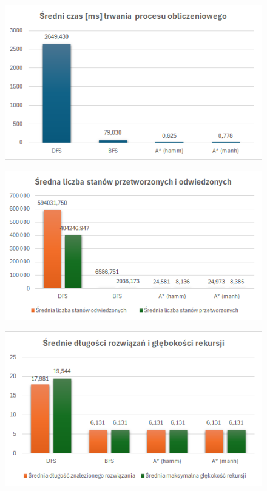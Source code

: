\documentclass{classrep}
\begin{document}
\begin{figure}
    \centering
    \includegraphics[width=\textwidth,height=\textheight,keepaspectratio]{average-time-with-dfs}
    \caption{}
    \label{fig:1}
\end{figure}
\begin{figure}
    \centering
    \includegraphics[width=\textwidth,height=\textheight,keepaspectratio]{average-count-of-visited-with-dfs}
    \caption{}
    \label{fig:2}
\end{figure}
\begin{figure}
    \centering
    \includegraphics[width=\textwidth,height=\textheight,keepaspectratio]{average-solution-lenghts}
    \caption{}
    \label{fig:3}
\end{figure}
\end{document}
